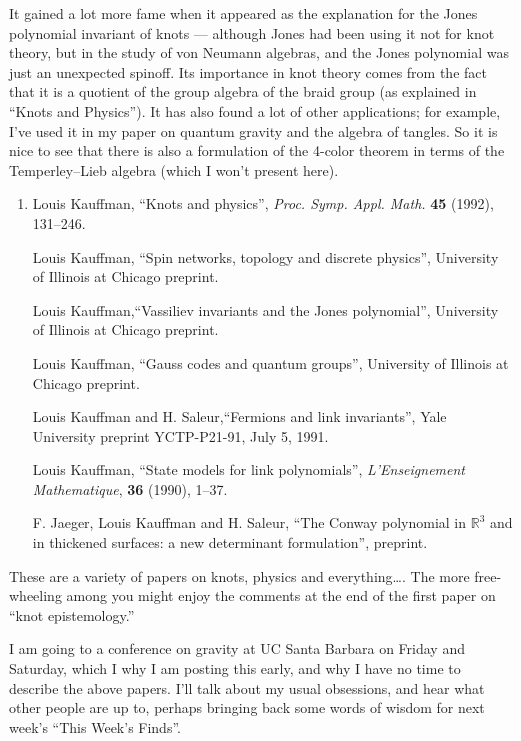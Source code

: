 \documentclass{article}
\begin{document}
It gained a lot more fame when it appeared as the explanation for the
Jones polynomial invariant of knots --- although Jones had been using it
not for knot theory, but in the study of von Neumann algebras, and the
Jones polynomial was just an unexpected spinoff. Its importance in knot
theory comes from the fact that it is a quotient of the group algebra of
the braid group (as explained in ``Knots and Physics''). It has also
found a lot of other applications; for example, I've used it in my paper
on quantum gravity and the algebra of tangles. So it is nice to see that
there is also a formulation of the 4-color theorem in terms of the
Temperley--Lieb algebra (which I won't present here).

\begin{enumerate}
\def\labelenumi{\arabic{enumi})}
\setcounter{enumi}{4}
\item
  Louis Kauffman, ``Knots and physics'', \emph{Proc. Symp. Appl.
  Math.} \textbf{45} (1992), 131--246.

   Louis Kauffman, ``Spin networks, topology and discrete physics'',
  University of Illinois at Chicago preprint.

   Louis Kauffman,``Vassiliev invariants and the Jones polynomial'',
  University of Illinois at Chicago preprint.

  Louis Kauffman, ``Gauss codes and quantum groups'', University of
  Illinois at Chicago preprint.

   Louis Kauffman and H. Saleur,``Fermions and link invariants'',
  Yale University preprint YCTP-P21-91, July 5, 1991.

  Louis Kauffman, ``State models for link polynomials'',
  \emph{L'Enseignement Mathematique}, \textbf{36} (1990), 1--37.

  F. Jaeger, Louis Kauffman and H.
  Saleur, ``The Conway polynomial in \(\mathbb{R}^3\) and in thickened surfaces: a
  new determinant formulation'', preprint.
\end{enumerate}

These are a variety of papers on knots, physics and everything\ldots.
The more free-wheeling among you might enjoy the comments at the end of
the first paper on ``knot epistemology.''

I am going to a conference on gravity at UC Santa Barbara on Friday and
Saturday, which I why I am posting this early, and why I have no time to
describe the above papers. I'll talk about my usual obsessions, and hear
what other people are up to, perhaps bringing back some words of wisdom
for next week's ``This Week's Finds''.
\end{document}

